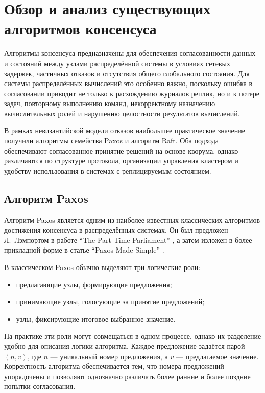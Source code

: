 \section{Обзор и анализ существующих алгоритмов консенсуса}

Алгоритмы консенсуса предназначены для обеспечения согласованности данных и
состояний между узлами распределённой системы в условиях сетевых задержек,
частичных отказов и отсутствия общего глобального состояния. Для системы
распределённых вычислений это особенно важно, поскольку ошибка в согласовании
приводит не только к расхождению журналов реплик, но и к потере задач,
повторному выполнению команд, некорректному назначению вычислительных ролей и
нарушению целостности результатов вычислений.

В рамках невизантийской модели отказов наибольшее практическое значение
получили алгоритмы семейства Paxos и алгоритм Raft. Оба подхода обеспечивают
согласованное принятие решений на основе кворума, однако различаются по
структуре протокола, организации управления кластером и удобству использования
в системах с реплицируемым состоянием.

\subsection{Алгоритм Paxos}

Алгоритм Paxos является одним из наиболее известных классических алгоритмов
достижения консенсуса в распределённых системах. Он был предложен Л.~Лэмпортом
в работе \enquote{The Part-Time Parliament} \cite{lamport98}, а затем изложен в
более прикладной форме в статье \enquote{Paxos Made Simple} \cite{lamport01}.

В классическом Paxos обычно выделяют три логические роли:

\begin{itemize}
    \item предлагающие узлы, формирующие предложения;
    \item принимающие узлы, голосующие за принятие предложений;
    \item узлы, фиксирующие итоговое выбранное значение.
\end{itemize}

На практике эти роли могут совмещаться в одном процессе, однако их разделение
удобно для описания логики алгоритма. Каждое предложение задаётся парой $(n,
v)$, где $n$ --- уникальный номер предложения, а $v$ --- предлагаемое значение.
Корректность алгоритма обеспечивается тем, что номера предложений упорядочены и
позволяют однозначно различать более ранние и более поздние попытки
согласования.

